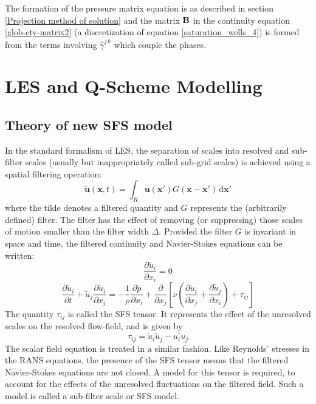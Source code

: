The formation of the pressure matrix equation is as described in section \ref{Projection method of solution} and the matrix ${\bf B}$ in the continuity equation \ref{glob-cty-matrix2} (a discretization of equation \ref{saturation_wells_4}) is formed from the terms involving $\hat\gamma^{j\, k}$ which couple the phases. 


\pagebreak




\section{LES and Q-Scheme Modelling} 
\label{LES and Q-Scheme Modelling} 



\subsection{Theory of new SFS model}
\label{SFSm} In the standard formalism of LES, the separation of
scales into resolved and sub-filter scales (usually but
inappropriately called sub-grid scales) is achieved using a
spatial filtering operation:
\begin{equation}
\mathbf{\tilde{u}}(\mathbf{x},t)= \int_{R} \mathbf{u}(\mathbf{x}')
G(\mathbf{x}-\mathbf{x}')\,\mathrm{d}\mathbf{x}'
\label{eq:Les-filter}
\end{equation}
where the tilde denotes a filtered quantity and $G$ represents the
(arbitrarily defined) filter. The filter has the effect of
removing (or suppressing) those scales of motion smaller than the
filter width $\Delta$. Provided the filter $G$ is invariant in
space and time\label{homo}, the filtered continuity and
Navier-Stokes equations can be written:
\begin{equation}
\frac{\partial \tilde{u}_i}{\partial x_i}=0
\end{equation}
\begin{equation}
\frac{\partial \tilde{u}_i}{\partial t}+ \tilde{u}_j
\frac{\partial \tilde{u}_i}{\partial x_j}= -\frac{1}{\rho}
\frac{\partial \tilde{p}}{\partial x_i}+ \frac{\partial}{\partial
x_j} \left[\nu\left(\frac{\partial \tilde{u}_i}{\partial x_j}+
\frac{\partial \tilde{u}_j}{\partial x_i}\right)+\tau_{ij}\right]
\label{eq:Les-NS2}
\end{equation}
The quantity $\tau_{ij}$ is called the SFS tensor. It represents
the effect of the unresolved scales on the resolved flow-field,
and is given by
\begin{equation}
\tau_{ij} = \tilde{u}_i \tilde{u}_j - \widetilde{u_i u_j}
\end{equation}
The scalar field equation is treated in a similar fashion. Like
Reynolds' stresses in the RANS equations, the presence of the SFS
tensor means that the filtered Navier-Stokes equations are not
closed. A model for this tensor is required, to account for the
effects of the unresolved fluctuations on the filtered field. Such
a model is called a sub-filter scale or SFS model.

